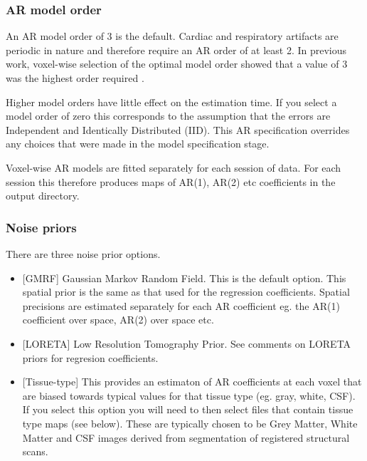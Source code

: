 \documentclass[a4paper,titlepage]{book}
\begin{document}
\subsubsection{AR model order}
An AR model order of 3 is the default. Cardiac and respiratory artifacts are periodic in nature and therefore require an AR order of at least 2. In previous work, voxel-wise selection of the optimal model order showed that a value of 3 was the highest order required \cite{vb_fmri_ar}.

                                                                                                            

Higher model orders have little effect on the estimation time. If you select a model order of zero this corresponds to the assumption that the errors are Independent and Identically Distributed (IID). This AR specification overrides any choices that were made in the model specification stage.

                                                                                                            

Voxel-wise AR models are fitted separately for each session of data. For each session this therefore produces maps of AR(1), AR(2) etc coefficients in the output directory. 


\subsubsection{Noise priors}
There are three noise prior options.
\begin{itemize}


\item{[GMRF] Gaussian Markov Random Field. This is the default option. This spatial prior is the same as that used for the regression coefficients. Spatial precisions are estimated separately for each AR coefficient eg. the AR(1) coefficient over space, AR(2) over space etc.}

\item{[LORETA] Low Resolution Tomography Prior. See comments on LORETA priors for regresion coefficients.}


\item{[Tissue-type] This provides an estimaton of AR coefficients at each voxel that are biased towards typical values for that tissue type (eg. gray, white, CSF). If you select this option you will need to then select files that contain tissue type maps (see below). These are typically chosen to be Grey Matter, White Matter and CSF images derived from segmentation of registered structural scans.}

\end{itemize}
                                                                                                            
\end{document}
